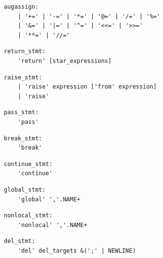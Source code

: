 \noindent\textbf{\texttt{}}\par
\begin{lstlisting}
augassign:
    | '+=' | '-=' | '*=' | '@=' | '/=' | '%='
    | '&=' | '|=' | '^=' | '<<=' | '>>='
    | '**=' | '//='
\end{lstlisting}

\noindent\textbf{\texttt{}}\par
\begin{lstlisting}
return_stmt:
    'return' [star_expressions]
\end{lstlisting}

\noindent\textbf{\texttt{}}\par
\begin{lstlisting}
raise_stmt:
    | 'raise' expression ['from' expression]
    | 'raise'
\end{lstlisting}

\noindent\textbf{\texttt{}}\par
\begin{lstlisting}
pass_stmt:
    'pass'
\end{lstlisting}

\noindent\textbf{\texttt{}}\par
\begin{lstlisting}
break_stmt:
    'break'
\end{lstlisting}

\noindent\textbf{\texttt{}}\par
\begin{lstlisting}
continue_stmt:
    'continue'
\end{lstlisting}

\noindent\textbf{\texttt{}}\par
\begin{lstlisting}
global_stmt:
    'global' ','.NAME+
\end{lstlisting}

\noindent\textbf{\texttt{}}\par
\begin{lstlisting}
nonlocal_stmt:
    'nonlocal' ','.NAME+
\end{lstlisting}

\noindent\textbf{\texttt{}}\par
\begin{lstlisting}
del_stmt:
    'del' del_targets &(';' | NEWLINE)
\end{lstlisting}

